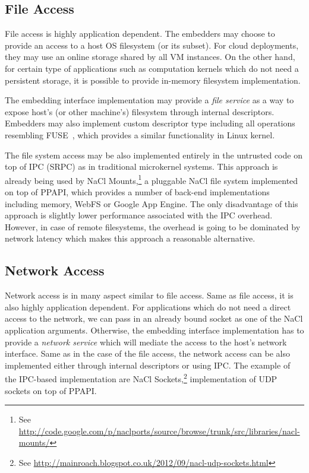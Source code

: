 
\subsection{File Access}
\label{sub:file_access}

File access is highly application dependent. The embedders may choose to
provide an access to a host OS filesystem (or its subset).  For cloud
deployments, they may use an online storage shared by all VM instances.
On the other hand, for certain type of applications such as computation
kernels which do not need a persistent storage, it is possible to
provide in-memory filesystem implementation.

The embedding interface implementation may provide a \emph{file service}
as a way to expose host's (or other machine's) filesystem through
internal descriptors. Embedders may also implement custom descriptor
type including all operations resembling
FUSE~\cite{fuse}, which provides a similar functionality in Linux kernel.

The file system access may be also implemented entirely in the untrusted
code on top of IPC (\ie SRPC) as in traditional microkernel systems.
This approach is already being used by
NaCl Mounts,\footnote{See \url{http://code.google.com/p/naclports/source/browse/trunk/src/libraries/nacl-mounts/}}
a pluggable NaCl file system implemented on top of PPAPI, which provides
a number of back-end implementations including memory, WebFS or Google
App Engine. The only disadvantage of this approach is slightly lower
performance associated with the IPC overhead. However, in case of remote
filesystems, the overhead is going to be dominated by network latency
which makes this approach a reasonable alternative.

\subsection{Network Access}
\label{sub:network_access}

Network access is in many aspect similar to file access. Same as file
access, it is also highly application dependent. For applications which
do not need a direct access to the network, we can pass in an already
bound socket as one of the NaCl application arguments. Otherwise, the
embedding interface implementation has to provide a \emph{network
service} which will mediate the access to the host's network interface.
Same as in the case of the file access, the network access can be also
implemented either through internal descriptors or using IPC. The
example of the IPC-based implementation are NaCl
Sockets,\footnote{See \url{http://mainroach.blogspot.co.uk/2012/09/nacl-udp-sockets.html}}
implementation of UDP sockets on top of PPAPI.

